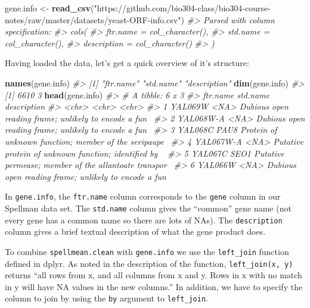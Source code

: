 \documentclass[]{book}
\newenvironment{Shaded}{\begin{snugshade}}{\end{snugshade}}
\newcommand{\CommentTok}[1]{\textcolor[rgb]{0.56,0.35,0.01}{\textit{#1}}}
\newcommand{\KeywordTok}[1]{\textcolor[rgb]{0.13,0.29,0.53}{\textbf{#1}}}
\newcommand{\NormalTok}[1]{#1}
\newcommand{\StringTok}[1]{\textcolor[rgb]{0.31,0.60,0.02}{#1}}
\theoremstyle{definition}
\theoremstyle{definition}
\theoremstyle{definition}
\theoremstyle{remark}
\begin{document}
\begin{Shaded}
\begin{Highlighting}[]
\NormalTok{gene.info <-}\StringTok{ }\KeywordTok{read_csv}\NormalTok{(}\StringTok{"https://github.com/bio304-class/bio304-course-notes/raw/master/datasets/yeast-ORF-info.csv"}\NormalTok{)}
\CommentTok{#> Parsed with column specification:}
\CommentTok{#> cols(}
\CommentTok{#>   ftr.name = col_character(),}
\CommentTok{#>   std.name = col_character(),}
\CommentTok{#>   description = col_character()}
\CommentTok{#> )}
\end{Highlighting}
\end{Shaded}

Having loaded the data, let's get a quick overview of it's structure:

\begin{Shaded}
\begin{Highlighting}[]
\KeywordTok{names}\NormalTok{(gene.info)}
\CommentTok{#> [1] "ftr.name"    "std.name"    "description"}
\KeywordTok{dim}\NormalTok{(gene.info)}
\CommentTok{#> [1] 6610    3}
\KeywordTok{head}\NormalTok{(gene.info)}
\CommentTok{#> # A tibble: 6 x 3}
\CommentTok{#>   ftr.name  std.name description                                          }
\CommentTok{#>   <chr>     <chr>    <chr>                                                }
\CommentTok{#> 1 YAL069W   <NA>     Dubious open reading frame; unlikely to encode a fun~}
\CommentTok{#> 2 YAL068W-A <NA>     Dubious open reading frame; unlikely to encode a fun~}
\CommentTok{#> 3 YAL068C   PAU8     Protein of unknown function; member of the seripaupe~}
\CommentTok{#> 4 YAL067W-A <NA>     Putative protein of unknown function; identified by ~}
\CommentTok{#> 5 YAL067C   SEO1     Putative permease; member of the allantoate transpor~}
\CommentTok{#> 6 YAL066W   <NA>     Dubious open reading frame; unlikely to encode a fun~}
\end{Highlighting}
\end{Shaded}

In \texttt{gene.info}, the \texttt{ftr.name} column corresponds to the
\texttt{gene} column in our Spellman data set. The \texttt{std.name}
column gives the ``common'' gene name (not every gene has a common name
so there are lots of NAs). The \texttt{description} column gives a brief
textual description of what the gene product does.

To combine \texttt{spellmean.clean} with \texttt{gene.info} we use the
\texttt{left\_join} function defined in dplyr. As noted in the
description of the function, \texttt{left\_join(x,\ y)} returns ``all
rows from x, and all columns from x and y. Rows in x with no match in y
will have NA values in the new columns.'' In addition, we have to
specify the column to join by using the \texttt{by} argument to
\texttt{left\_join}.
\end{document}
